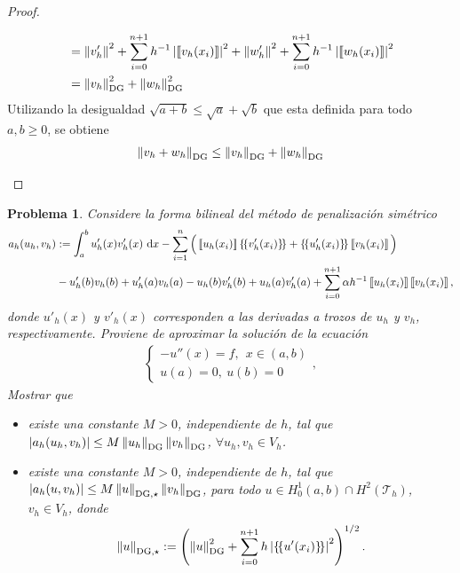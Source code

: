 \documentclass[10pt,a4paper]{report}
\newtheorem{pro}{Problema}
\newcommand{\dx}{\textup{d}x}
\newcommand{\DG}{\textup{DG}}
\providecommand{\abs}[1]{\left\lvert#1\right\rvert}
\providecommand{\norm}[1]{\left\lVert#1\right\rVert}
\providecommand{\salto}[1]{\left\llbracket#1\right\rrbracket}
\providecommand{\prom}[1]{\{\!\{#1\}\!\}}
\begin{document}
\begin{proof}
\begin{itemize}
\begin{align*}
        	&= \norm{v'_{h}}^{2}  + \sum_{i=0}^{n+1}h^{-1}\abs{\salto{ v_{h}(x_{i}) }}^{2}+ \norm{w'_{h}}^{2} +  \sum_{i=0}^{n+1}h^{-1}\abs{\salto{w_{h}(x_{i})}}^{2}\\
        	&= \norm{v_{h}}^{2}_{\DG} + \norm{w_{h}}^{2}_{\DG} 
        \end{align*}
        Utilizando la desigualdad $\sqrt{a+b}\leq \sqrt{a} + \sqrt{b}$ que esta definida para todo $a,b\geq0$, se obtiene 
        \begin{align*}
        	\norm{v_{h}+w_{h}}_{\DG} \leq \norm{v_{h}}_{\DG} + \norm{w_{h}}_{\DG}
        \end{align*}
    	\end{itemize}
    \end{proof}
    \begin{pro}
    	Considere la forma bilineal del método de penalización simétrico 
    	\begin{align*}
    		a_{h}(u_{h},v_{h}) &:= \int_{a}^{b} u'_{h}(x)v'_{h}(x)\ \dx - \sum_{i=1}^{n}\Big(\salto{u_{h}(x_{i})}\prom{v'_{h}(x_{i})} + \prom{u'_{h}(x_{i})}\salto{v_{h}(x_{i})}\Big)\\
    		&-u'_{h}(b)v_{h}(b) + u'_{h}(a)v_{h}(a) - u_{h}(b)v'_{h}(b) + u_{h}(a)v'_{h}(a) + \sum_{i=0}^{n+1}\alpha h^{-1}\salto{u_{h}(x_{i})}\salto{v_{h}(x_{i})},
    	\end{align*}
        donde $u'_{h}(x)$ y $v'_{h}(x)$ corresponden a las derivadas a trozos de $u_{h}$ y $v_{h}$, respectivamente. Proviene de
        aproximar la solución de la ecuación
        \begin{align}
        	\left\{\begin{matrix}
        		-u''(x) = f,\ \ x\in (a,b) \\ 
        		u(a) = 0,\ u(b) = 0 
        	\end{matrix}\right.,
        \end{align}
        Mostrar que 
        \begin{itemize}
        	\item[$(a)$] existe una constante $M>0$, independiente de $h$, tal que $\abs{a_{h}(u_{h},v_{h})}\leq M\norm{u_{h}}_{\DG}\norm{v_{h}}_{\DG}$, $\forall u_{h},v_{h}\in V_{h}$.
        	\item[$(b)$] existe una constante $M>0$, independiente de $h$, tal que $\abs{a_{h}(u,v_{h})}\leq M\norm{u}_{\DG,\star}\norm{v_{h}}_{\DG}$, para todo $u\in H_{0}^{1}(a,b)\cap H^{2}(\mathcal{T}_{h})$, $v_{h}\in V_{h}$, donde 
        	\begin{align*}
        		\norm{u}_{\DG,\star} := \left( \norm{u}^{2}_{\DG} + \sum_{i=0}^{n+1}h\abs{\prom{u'(x_{i})}}^{2} \right)^{1/2}.
        	\end{align*}
        \end{itemize}
    \end{pro}
\end{document}

